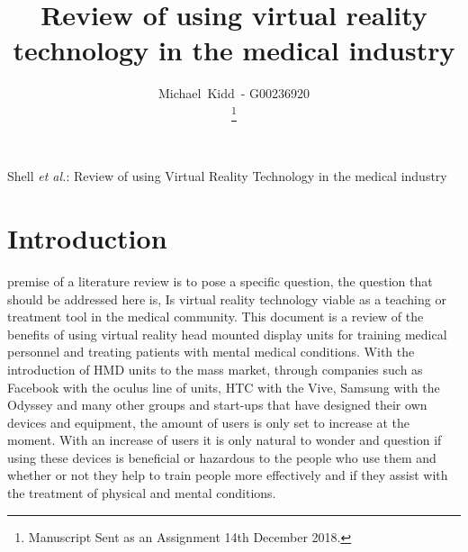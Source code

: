\documentclass[10pt,journal,compsoc]{IEEEtran}
\begin{document}
	
	\title{Review of using virtual reality technology in the medical industry}
	
	\author{Michael~Kidd~- G00236920%
	
		\thanks{Manuscript Sent as an Assignment 14th December 2018.}}
	
	{Shell \MakeLowercase{\textit{et al.}}: Review of using Virtual Reality Technology in the medical industry}
	
	 
	\maketitle
	
	\section{Introduction}
	 premise of a literature review is to pose a specific question, the question that should be addressed here is, Is virtual reality technology viable as a teaching or treatment tool in the medical community. This document is a review of the benefits of using virtual reality head mounted display units for training medical personnel and treating patients with mental medical conditions. With the introduction of HMD units to the mass market, through companies such as Facebook with the oculus line of units, HTC with the Vive, Samsung with the Odyssey and many other groups and start-ups that have designed their own devices and equipment, the amount of users is only set to increase at the moment. With an increase of users it is only natural to wonder and question if using these devices is beneficial or hazardous to the people who use them and whether or not they help to train people more effectively and if they assist with the treatment of physical and mental conditions. \newline
	
\end{document}
